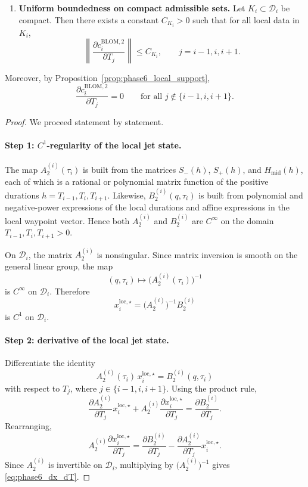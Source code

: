 \begin{proposition}
\begin{enumerate}
    \item \textbf{Uniform boundedness on compact admissible sets.}
    Let \(K_i\subset \mathcal D_i\) be compact.
    Then there exists a constant \(C_{K_i}>0\) such that for all local data in \(K_i\),
    \begin{equation}
    \label{eq:phase6_bounded_dcdT}
    \left\|
    \frac{\partial c_i^{\mathrm{BLOM},2}}{\partial T_j}
    \right\|
    \le C_{K_i},
    \qquad
    j=i-1,i,i+1.
    \end{equation}
\end{enumerate}
Moreover, by Proposition~\ref{prop:phase6_local_support},
\[
\frac{\partial c_i^{\mathrm{BLOM},2}}{\partial T_j}=0
\qquad\text{for all } j\notin\{i-1,i,i+1\}.
\]
\end{proposition}

\begin{proof}
We proceed statement by statement.

\paragraph{Step 1: \(C^1\)-regularity of the local jet state.}
The map \(A_2^{(i)}(\tau_i)\) is built from the matrices \(S_-(h)\), \(S_+(h)\), and \(H_{\mathrm{mid}}(h)\), each of which is a rational or polynomial matrix function of the positive durations \(h=T_{i-1},T_i,T_{i+1}\).
Likewise, \(B_2^{(i)}(q,\tau_i)\) is built from polynomial and negative-power expressions of the local durations and affine expressions in the local waypoint vector.
Hence both \(A_2^{(i)}\) and \(B_2^{(i)}\) are \(C^\infty\) on the domain \(T_{i-1},T_i,T_{i+1}>0\).

On \(\mathcal D_i\), the matrix \(A_2^{(i)}\) is nonsingular.
Since matrix inversion is smooth on the general linear group, the map
\[
(q,\tau_i)\mapsto \bigl(A_2^{(i)}(\tau_i)\bigr)^{-1}
\]
is \(C^\infty\) on \(\mathcal D_i\).
Therefore
\[
x_i^{\mathrm{loc},\star}
=
\bigl(A_2^{(i)}\bigr)^{-1}B_2^{(i)}
\]
is \(C^1\) on \(\mathcal D_i\).

\paragraph{Step 2: derivative of the local jet state.}
Differentiate the identity
\[
A_2^{(i)}(\tau_i)\,x_i^{\mathrm{loc},\star}=B_2^{(i)}(q,\tau_i)
\]
with respect to \(T_j\), where \(j\in\{i-1,i,i+1\}\).
Using the product rule,
\[
\frac{\partial A_2^{(i)}}{\partial T_j}x_i^{\mathrm{loc},\star}
+
A_2^{(i)}\frac{\partial x_i^{\mathrm{loc},\star}}{\partial T_j}
=
\frac{\partial B_2^{(i)}}{\partial T_j}.
\]
Rearranging,
\[
A_2^{(i)}\frac{\partial x_i^{\mathrm{loc},\star}}{\partial T_j}
=
\frac{\partial B_2^{(i)}}{\partial T_j}
-
\frac{\partial A_2^{(i)}}{\partial T_j}x_i^{\mathrm{loc},\star}.
\]
Since \(A_2^{(i)}\) is invertible on \(\mathcal D_i\), multiplying by \(\bigl(A_2^{(i)}\bigr)^{-1}\) gives \eqref{eq:phase6_dx_dT}.


\end{proof}
